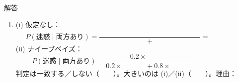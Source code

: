 \documentclass[a4paper,dvipdfmx]{jsarticle}
\newcommand{\提出期限}{2026年11月16日（月）}
\newcommand{\学籍番号}{0000000}
\newcommand{\氏名}{氏名を書く}
\newcommand{\提出日}{2026年11月16日}
\newenvironment{answer}{\begin{itembox}[l]{解答}}{\end{itembox}}
\begin{document}
\begin{enumerate}
\begin{answer}
\begin{enumerate}
          通常：独立なら \phantom{XXXX} $\times$ \phantom{XXXX} $= $ \phantom{XXXX}、実際は $\dfrac{\phantom{XXX}}{800} = $ \phantom{XXXX}
          \vspace{2mm}

          比較：
          \vspace{8mm}
        \item (i) 仮定なし：
          \begin{equation*}
            P(\text{迷惑} \mid \text{両方あり}) = \frac{\phantom{XXXXXXXX}}{\phantom{XXXXXXXX} + \phantom{XXXXXXXX}} = \phantom{XXXXXX}
          \end{equation*}
          (ii) ナイーブベイズ：
          \begin{equation*}
            P(\text{迷惑} \mid \text{両方あり}) = \frac{0.2 \times \phantom{XXXX}}{0.2 \times \phantom{XXXX} + 0.8 \times \phantom{XXXX}} = \phantom{XXXXXX}
          \end{equation*}
          判定は一致する／しない（　　）。大きいのは (i)／(ii)（　　）。理由：
          \vspace{14mm}
      \end{enumerate}
    \end{answer}


\end{enumerate}
\end{document}
